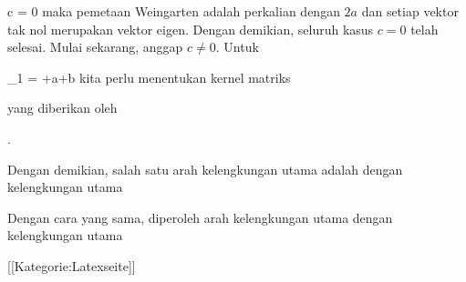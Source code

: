 \mavergleichskette
{\vergleichskette
{ c
}
{ = }{ 0
}
{  }{
}
{    }{
}
{   }{
}
}
{}{}{}
maka pemetaan Weingarten adalah perkalian dengan $2a$ dan setiap vektor tak nol merupakan vektor eigen. Dengan demikian, seluruh kasus $c=0$ telah selesai. Mulai sekarang, anggap $c\neq 0$. Untuk

\mavergleichskettedisp
{\vergleichskette
{ \lambda_{1}
}
{ =} {  +a+b
}
{ } {
}
{ } {
}
{ } {
}
}
{}{}{}
kita perlu menentukan kernel matriks

 {  }

yang diberikan oleh

 { . }

Dengan demikian, salah satu arah kelengkungan utama adalah
 dengan kelengkungan utama

Dengan cara yang sama, diperoleh arah kelengkungan utama
 dengan kelengkungan utama

 [[Kategorie:Latexseite]]
